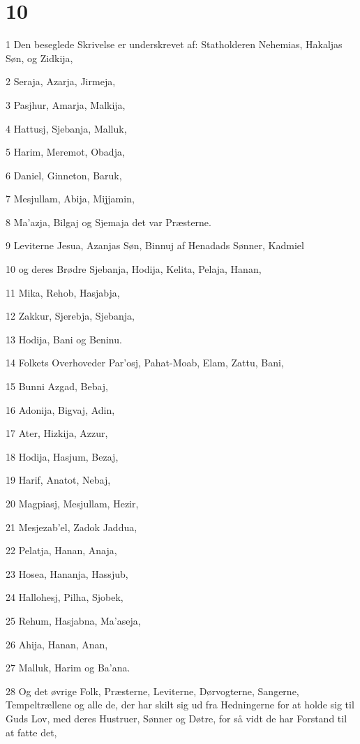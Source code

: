 \chapter{10}

\par 1 Den beseglede Skrivelse er underskrevet af: Statholderen Nehemias, Hakaljas Søn, og Zidkija,
\par 2 Seraja, Azarja, Jirmeja,
\par 3 Pasjhur, Amarja, Malkija,
\par 4 Hattusj, Sjebanja, Malluk,
\par 5 Harim, Meremot, Obadja,
\par 6 Daniel, Ginneton, Baruk,
\par 7 Mesjullam, Abija, Mijjamin,
\par 8 Ma'azja, Bilgaj og Sjemaja det var Præsterne.
\par 9 Leviterne Jesua, Azanjas Søn, Binnuj af Henadads Sønner, Kadmiel
\par 10 og deres Brødre Sjebanja, Hodija, Kelita, Pelaja, Hanan,
\par 11 Mika, Rehob, Hasjabja,
\par 12 Zakkur, Sjerebja, Sjebanja,
\par 13 Hodija, Bani og Beninu.
\par 14 Folkets Overhoveder Par'osj, Pahat-Moab, Elam, Zattu, Bani,
\par 15 Bunni Azgad, Bebaj,
\par 16 Adonija, Bigvaj, Adin,
\par 17 Ater, Hizkija, Azzur,
\par 18 Hodija, Hasjum, Bezaj,
\par 19 Harif, Anatot, Nebaj,
\par 20 Magpiasj, Mesjullam, Hezir,
\par 21 Mesjezab'el, Zadok Jaddua,
\par 22 Pelatja, Hanan, Anaja,
\par 23 Hosea, Hananja, Hassjub,
\par 24 Hallohesj, Pilha, Sjobek,
\par 25 Rehum, Hasjabna, Ma'aseja,
\par 26 Ahija, Hanan, Anan,
\par 27 Malluk, Harim og Ba'ana.
\par 28 Og det øvrige Folk, Præsterne, Leviterne, Dørvogterne, Sangerne, Tempeltrællene og alle de, der har skilt sig ud fra Hedningerne for at holde sig til Guds Lov, med deres Hustruer, Sønner og Døtre, for så vidt de har Forstand til at fatte det,
